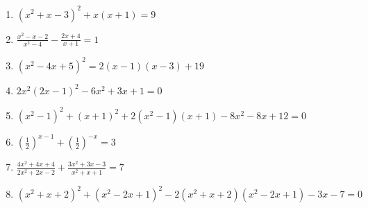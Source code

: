 \documentclass[11pt,a4paper]{article}
\begin{document}
\begin{enumerate}
\item \(\displaystyle (x^2+x-3)^2+x(x+1)=9\)
\item \(\displaystyle \frac{x^2-x-2}{x^2-4}-\frac{2x+4}{x+1}=1\)
\item \(\displaystyle (x^2-4x+5)^2=2(x-1)(x-3)+19\)
\item \(\displaystyle 2x^2(2x-1)^2-6x^2+3x+1=0\)
\item \(\displaystyle (x^2-1)^2+(x+1)^2+2(x^2-1)(x+1)-8x^2-8x+12=0\)
\item \(\displaystyle \left(\frac12\right)^{x-1}+\left(\frac12\right)^{-x}=3\)
\item \(\displaystyle \frac{4x^2+4x+4}{2x^2+2x-2}+\frac{3x^2+3x-3}{x^2+x+1}=7\)
\item \(\displaystyle (x^2+x+2)^2+(x^2-2x+1)^2-2(x^2+x+2)(x^2-2x+1)-3x-7=0\)
\end{enumerate}
\clearpage
\end{document}
